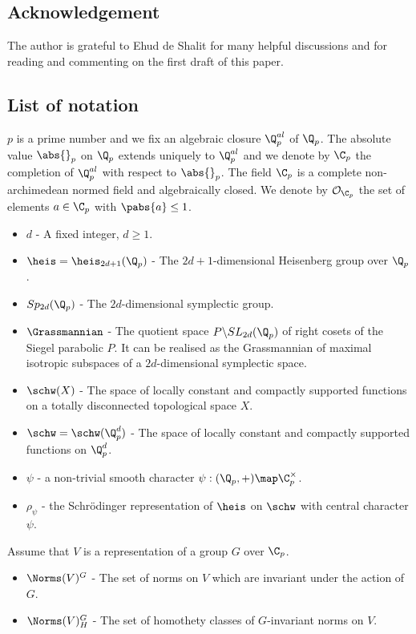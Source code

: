 \subsection*{Acknowledgement}
The author is grateful to Ehud de Shalit for many helpful discussions and for reading and commenting on the first draft of this paper.

    \subsection*{List of notation}
$p$ is a prime number and we fix an algebraic closure $\Q_p^{al}$ of $\Q_p$.
The absolute value $\abs{}_p$ on $\Q_p$ extends uniquely to $\Q_p^{al}$ and we denote by $\C_p$ the completion of $\Q_p^{al}$ with respect to $\abs{}_p$.
The field $\C_p$ is a complete non-archimedean normed field and algebraically closed.
We denote by $\mathcal{O}_{\C_p}$ the set of elements $a\in\C_p$ with $\pabs{a}\leq 1$.
    \begin{itemize}
    \item[]$d$ - A fixed integer, $d\geq 1$.
    \item[]$\heis=\heis_{2d+1}(\Q_p)$ - The $2d+1$-dimensional Heisenberg group over $\Q_p$.
    \item[]$Sp_{2d}(\Q_p)$ - The $2d$-dimensional symplectic group.
    \item[]$\Grassmannian$ - The quotient space $P\backslash SL_{2d}(\Q_p)$ of right cosets of the Siegel parabolic $P$. 
    It can be realised as the Grassmannian of maximal isotropic subspaces of a $2d$-dimensional symplectic space.
    \item[]$\schw(X)$ - The space of locally constant and compactly supported functions on a totally disconnected topological space $X$.
    \item[]$\schw=\schw(\Q_p^d)$ - The space of locally constant and compactly supported functions on $\Q_p^d$.
    \item[]$\psi$ - a non-trivial smooth character $\psi:(\Q_p,+)\map \C_p^\times$.
    \item[]$\rho_\psi$ - the Schrödinger representation of $\heis$ on $\schw$ with central character $\psi$.
    \end{itemize}
Assume that $V$ is a representation of a group $G$ over $\C_p$.
    \begin{itemize}
    \item[]$\Norms(V)^G$ - The set of norms on $V$ which are invariant under the action of $G$.
    \item[]$\Norms(V)_H^G$ - The set of homothety classes of $G$-invariant norms on $V$.
    \end{itemize}
